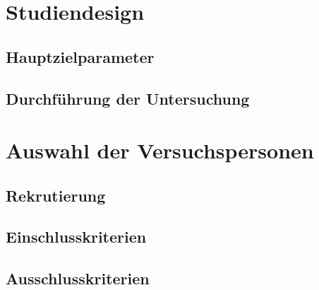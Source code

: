 %
%
\glsresetall
\let\raggedsection\centering 
{}
\let\raggedsection\raggedright 

\section{Studiendesign}\label{section.studiendesign}
\subsection{Hauptzielparameter}\label{subsection.hauptzielparameter}
\subsection{Durchführung der Untersuchung}\label{subsection.durchführung}

\section{Auswahl der Versuchspersonen}\label{section.auswahlVersuchsp}
\subsection{Rekrutierung}\label{subsection.rekrutierung}
\subsection{Einschlusskriterien}\label{subsection.einschlusskriterien}
\subsection{Ausschlusskriterien}\label{subsection.ausschlusskriterien}

